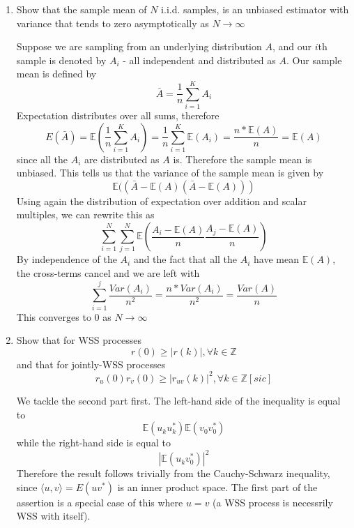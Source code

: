 \documentclass{article}
\newcommand{\chapternumber}{2}
\newenvironment{QandA}{\begin{enumerate}[label=\chapternumber.\arabic*]\bfseries\boldmath}
	{\end{enumerate}}
\newenvironment{answered}{\par\bigskip\normalfont\unboldmath}{}
\begin{document}
\begin{QandA}
\begin{answered}
		since the integrand above is just the pdf of the Dirichlet distribution with parameter vector $c$. This gives the value of the $i,j$th element as
		\[\frac{a_ia_j}{\bar{a}}\left(\frac{1}{\bar{a}+1}-\frac{1}{\bar{a}}\right)=-\frac{a_ia_j}{\bar{a}^2(\bar{a}+1)}\]
		If instead $i=j$, then define $d$ s.t. $d_k=a_k$ for $k\neq i$ and $d_i=a_i+2$. So our expression for the $i,i$th element becomes
		\[\frac{a_i(a_i+1)}{\bar{a}(\bar{a}+1)}\int_D\frac{\Gamma(\bar{d})}{\Gamma(d_1)...\Gamma(d_k)}\prod_{k=1}^Kx_k^{d_k-1}dx-\frac{a_i^2}{\bar{a}^2}\]
		As with the previous examples, the integral just evaluates to 1, so this simplifies to
		\[\frac{a_i}{\bar{a}(\bar{a}+1)}+\frac{a_i^2}{\bar{a}}\left(\frac{1}{\bar{a}+1}-\frac{1}{\bar{a}}\right)=\frac{\bar{a}a_i-a_i^2}{\bar{a}^2(\bar{a}+1)}\]
		When we consider this across all $i,j$, we get the proposed expression for covariance.
	\end{answered}
		
		
	\item Show that the sample mean of $N$ i.i.d. samples, is an unbiased estimator with variance that tends to zero asymptotically as $N\rightarrow\infty$
	\begin{answered}
		Suppose we are sampling from an underlying distribution $A$, and our $i$th sample is denoted by $A_i$ - all independent and distributed as $A$. Our sample mean is defined by
		\[\bar{A}=\frac{1}{n}\sum_{i=1}^{K}A_i\]
		Expectation distributes over all sums, therefore
		\[E(\bar{A})=\mathbb{E}\left(\frac{1}{n}\sum_{i=1}^{K}A_i\right)=\frac{1}{n}\sum_{i=1}^{K}\mathbb{E}(A_i)=\frac{n*\mathbb{E}(A)}{n}=\mathbb{E}(A)\]
		since all the $A_i$ are distributed as $A$ is. Therefore the sample mean is unbiased.
		This tells us that the variance of the sample mean is given by 
		\[\mathbb{E}((\bar{A}-\mathbb{E}(A)(\bar{A}-\mathbb{E}(A)))\]
		Using again the distribution of expectation over addition and scalar multiples, we can rewrite this as
		\[\sum_{i=1}^N\sum_{j=1}^N\mathbb{E}\left(\frac{A_i-\mathbb{E}(A)}{n}\frac{A_j-\mathbb{E}(A)}{n}\right)\]
		By independence of the $A_i$ and the fact that all the $A_i$ have mean $\mathbb{E}(A)$, the cross-terms cancel and we are left with
		\[\sum_{i=1}^j\frac{Var(A_i)}{n^2}=\frac{n*Var(A_i)}{n^2} = \frac{Var(A)}{n}\]
		This converges to 0 as $N\rightarrow\infty$
	\end{answered}
	
	\item Show that for WSS processes
	\[r(0)\geq |r(k)|,\forall k\in \mathbb{Z}\]
	and that for jointly-WSS processes
	\[r_u(0)r_v(0)\geq|r_{uv}(k)|^2,\forall k\in \mathbb{Z}[sic]\]
	\begin{answered}
		We tackle the second part first. The left-hand side of the inequality is equal to
		\[\mathbb{E}(u_ku_k^*)\mathbb{E}(v_0v_0^*)\]
		while the right-hand side is equal to
		\[|\mathbb{E}(u_kv_0^*)|^2\]
		Therefore the result follows trivially from the Cauchy-Schwarz inequality, since $\langle u,v\rangle =E(uv^*)$ is an inner product space. The first part of the assertion is a special case of this where $u=v$ (a WSS process is necessrily WSS with itself).
		

\end{answered}
\end{QandA}
\end{document}
